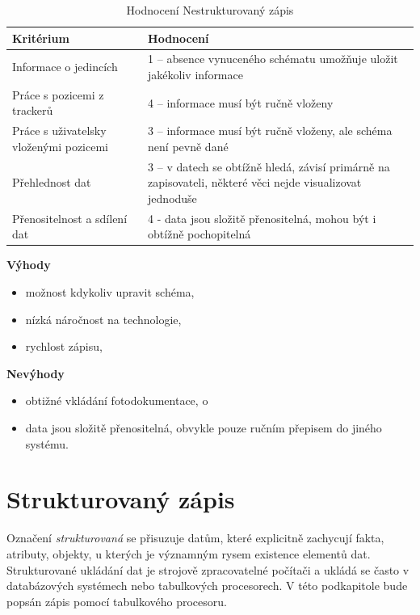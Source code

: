 \begin{table}[h]
	\begin{tabular}{ | l | l | }
		\hline
		Kritérium                              & Hodnocení \\
 		\hline			
		Informace o jedincích                  & 1 -- absence vynuceného schématu umožňuje uložit jakékoliv informace          \\
		Práce s pozicemi z trackerů            & 4 -- informace musí být ručně vloženy          \\
		Práce s uživatelsky vloženými pozicemi & 3 -- informace musí být ručně vloženy, ale schéma není pevně dané          \\
		Přehlednost dat                        & 3 -- v datech se obtížně hledá, závisí primárně na zapisovateli, některé věci nejde visualizovat jednoduše          \\
		Přenositelnost a sdílení dat           & 4 - data jsou složitě přenositelná, mohou být i obtížně pochopitelná          \\
		\hline	
	\end{tabular}
	\caption{Hodnocení Nestrukturovaný zápis}
\end{table}

\textbf{Výhody}

\begin{itemize}
	\item možnost kdykoliv upravit schéma,
	\item nízká náročnost na technologie,
	\item rychlost zápisu,
\end{itemize}

\textbf{Nevýhody}

\begin{itemize}
	\item obtižné vkládání fotodokumentace, o
	\item data jsou složitě přenositelná, obvykle pouze ručním přepisem do jiného systému.
\end{itemize}

\section{Strukturovaný zápis}


Označení \emph{strukturovaná} se přisuzuje datům, které explicitně zachycují fakta, atributy, objekty, u kterých je významným rysem existence elementů dat. Strukturované ukládání dat je strojově zpracovatelné počítači a ukládá se často v databázových systémech nebo tabulkových procesorech. V této podkapitole bude popsán zápis pomocí tabulkového procesoru.

